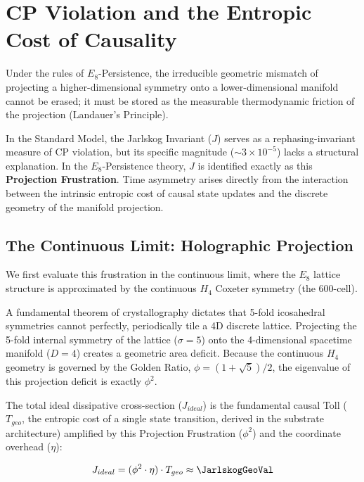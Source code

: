 \section{CP Violation and the Entropic Cost of Causality}

Under the rules of $E_8$-Persistence, the irreducible geometric mismatch of projecting a higher-dimensional symmetry onto a lower-dimensional manifold cannot be erased; it must be stored as the measurable thermodynamic friction of the projection (Landauer's Principle). 

In the Standard Model, the Jarlskog Invariant ($J$) serves as a rephasing-invariant measure of CP violation, but its specific magnitude ($\sim 3 \times 10^{-5}$) lacks a structural explanation. In the $E_8$-Persistence theory, $J$ is identified exactly as this \textbf{Projection Frustration}. Time asymmetry arises directly from the interaction between the intrinsic entropic cost of causal state updates and the discrete geometry of the manifold projection.

\subsection{The Continuous Limit: Holographic Projection}

We first evaluate this frustration in the continuous limit, where the $E_8$ lattice structure is approximated by the continuous $H_4$ Coxeter symmetry (the 600-cell). 

A fundamental theorem of crystallography dictates that 5-fold icosahedral symmetries cannot perfectly, periodically tile a 4D discrete lattice. Projecting the 5-fold internal symmetry of the lattice ($\sigma = 5$) onto the 4-dimensional spacetime manifold ($D = 4$) creates a geometric area deficit. Because the continuous $H_4$ geometry is governed by the Golden Ratio, $\phi = (1+\sqrt{5})/2$, the eigenvalue of this projection deficit is exactly $\phi^2$.

The total ideal dissipative cross-section ($J_{ideal}$) is the fundamental causal Toll ($T_{geo}$, the entropic cost of a single state transition, derived in the substrate architecture) amplified by this Projection Frustration ($\phi^2$) and the coordinate overhead ($\eta$):

\begin{equation}
    J_{ideal} = (\phi^2 \cdot \eta) \cdot T_{geo} \approx \mathbf{\JarlskogGeoVal}
    \label{eq:jarlskog_ideal}
\end{equation}

